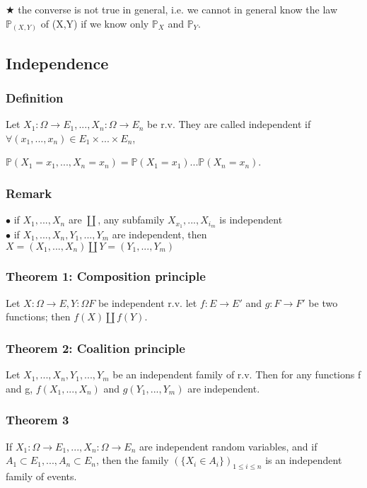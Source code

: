                 $\bigstar$ the converse is not true in general, i.e. we cannot in general know the law $\mathbb{P}_{(X,Y)}$ of (X,Y) if we know only $\mathbb{P}_X$ and $\mathbb{P}_Y$.

        \subsection{Independence}
            \subsubsection{Definition}
                Let $X_1: \Omega \rightarrow E_1,..., X_n:\Omega\rightarrow E_n$ be r.v. They are called independent if $\forall (x_1,...,x_n) \in E_1\times...\times E_n$,

                \vspace{5pt}
                
                \centerline{$\mathbb{P}(X_1=x_1,...,X_n=x_n) = \mathbb{P}(X_1=x_1)...\mathbb{P}(X_n=x_n)$.}

            \subsubsection{Remark}
                    \indent $\bullet$ if $X_1,...,X_n$ are $\coprod$, any subfamily $X_{x_1},...,X_{i_m}$ is independent \\
                    $\bullet$ if $X_1,...,X_n, Y_1,...,Y_m$ are independent, then $X=(X_1,...,X_n) \coprod Y=(Y_1,...,Y_m)$

            \subsubsection{Theorem 1: Composition principle}
                Let $X:\Omega \rightarrow E, Y:\Omega F$ be independent r.v. let $f:E\rightarrow E\prime$ and $g:F\rightarrow F\prime$ be two functions; then $f(X) \coprod f(Y)$.

            \subsubsection{Theorem 2: Coalition principle}
                Let $X_1,...,X_n, Y_1,...,Y_m$ be an independent family of r.v. Then for any functions f and g, $f(X_1,...,X_n)$ and $g(Y_1,...,Y_m)$ are independent.

            \subsubsection{Theorem 3}
                If $X_1:\Omega\rightarrow E_1,...,X_n:\Omega \rightarrow E_n$ are independent random variables, and if $A_1\subset E_1,...,A_n\subset E_n$, then the family $(\{X_i\in A_i\})_{1\leq i \leq n}$ is an independent family of events.

